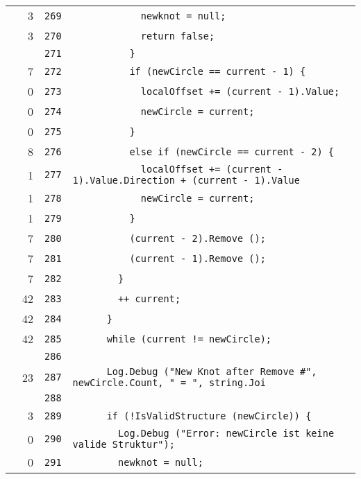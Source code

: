 \documentclass[a4paper,10pt]{article}
\begin{document}
\begin{longtable}[l]{lrrl}
\cellcolor{green} & 3 & \verb~269~ & \verb~            newknot = null;~\\
\cellcolor{green} & 3 & \verb~270~ & \verb~            return false;~\\
\cellcolor{gray} &  & \verb~271~ & \verb~          }~\\
\cellcolor{green} & 7 & \verb~272~ & \verb~          if (newCircle == current - 1) {~\\
\cellcolor{red} & 0 & \verb~273~ & \verb~            localOffset += (current - 1).Value;~\\
\cellcolor{red} & 0 & \verb~274~ & \verb~            newCircle = current;~\\
\cellcolor{red} & 0 & \verb~275~ & \verb~          }~\\
\cellcolor{green} & 8 & \verb~276~ & \verb~          else if (newCircle == current - 2) {~\\
\cellcolor{green} & 1 & \verb~277~ & \verb~            localOffset += (current - 1).Value.Direction + (current - 1).Value~\\
\cellcolor{green} & 1 & \verb~278~ & \verb~            newCircle = current;~\\
\cellcolor{green} & 1 & \verb~279~ & \verb~          }~\\
\cellcolor{green} & 7 & \verb~280~ & \verb~          (current - 2).Remove ();~\\
\cellcolor{green} & 7 & \verb~281~ & \verb~          (current - 1).Remove ();~\\
\cellcolor{green} & 7 & \verb~282~ & \verb~        }~\\
\cellcolor{green} & 42 & \verb~283~ & \verb~        ++ current;~\\
\cellcolor{green} & 42 & \verb~284~ & \verb~      }~\\
\cellcolor{green} & 42 & \verb~285~ & \verb~      while (current != newCircle);~\\
\cellcolor{gray} &  & \verb~286~ & \verb~~\\
\cellcolor{green} & 23 & \verb~287~ & \verb~      Log.Debug ("New Knot after Remove #", newCircle.Count, " = ", string.Joi~\\
\cellcolor{gray} &  & \verb~288~ & \verb~~\\
\cellcolor{green} & 3 & \verb~289~ & \verb~      if (!IsValidStructure (newCircle)) {~\\
\cellcolor{red} & 0 & \verb~290~ & \verb~        Log.Debug ("Error: newCircle ist keine valide Struktur");~\\
\cellcolor{red} & 0 & \verb~291~ & \verb~        newknot = null;~\\

\end{longtable}
\end{document}
